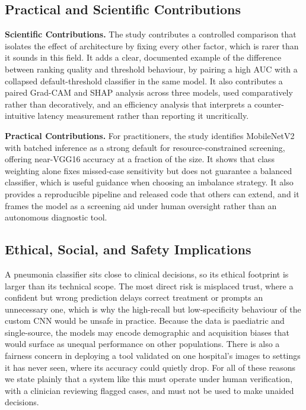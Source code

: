 \documentclass[preprint,12pt]{elsarticle}
\begin{document}
\subsection{Practical and Scientific Contributions}
\textbf{Scientific Contributions.}
The study contributes a controlled comparison that isolates the effect of architecture by fixing every other factor, which is rarer than it sounds in this field.
It adds a clear, documented example of the difference between ranking quality and threshold behaviour, by pairing a high AUC with a collapsed default-threshold classifier in the same model.
It also contributes a paired Grad-CAM and SHAP analysis across three models, used comparatively rather than decoratively, and an efficiency analysis that interprets a counter-intuitive latency measurement rather than reporting it uncritically.

\textbf{Practical Contributions.}
For practitioners, the study identifies MobileNetV2 with batched inference as a strong default for resource-constrained screening, offering near-VGG16 accuracy at a fraction of the size.
It shows that class weighting alone fixes missed-case sensitivity but does not guarantee a balanced classifier, which is useful guidance when choosing an imbalance strategy.
It also provides a reproducible pipeline and released code that others can extend, and it frames the model as a screening aid under human oversight rather than an autonomous diagnostic tool.

\subsection{Ethical, Social, and Safety Implications}
A pneumonia classifier sits close to clinical decisions, so its ethical footprint is larger than its technical scope.
The most direct risk is misplaced trust, where a confident but wrong prediction delays correct treatment or prompts an unnecessary one, which is why the high-recall but low-specificity behaviour of the custom CNN would be unsafe in practice.
Because the data is paediatric and single-source, the models may encode demographic and acquisition biases that would surface as unequal performance on other populations.
There is also a fairness concern in deploying a tool validated on one hospital's images to settings it has never seen, where its accuracy could quietly drop.
For all of these reasons we state plainly that a system like this must operate under human verification, with a clinician reviewing flagged cases, and must not be used to make unaided decisions.
\end{document}
